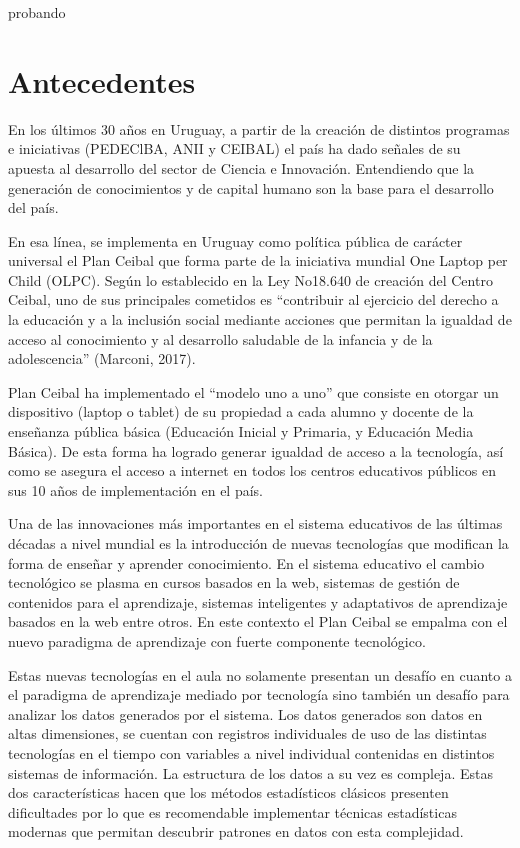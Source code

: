 \documentclass[msc,oneside,a4paper]{udelar}\usepackage[]{graphicx}\usepackage[]{color}
\begin{document}
probando



\chapter{Antecedentes}

En los últimos 30 años en Uruguay, a partir de la creación de distintos programas e iniciativas (PEDEClBA, ANII y CEIBAL) el país ha dado señales de su apuesta al desarrollo del sector de Ciencia e Innovación. Entendiendo que la generación de conocimientos y de capital humano son la base para el desarrollo del país.

En esa línea, se implementa en Uruguay como política pública de carácter universal el Plan Ceibal que forma parte de la iniciativa mundial One Laptop per Child (OLPC). Según lo establecido en la Ley No18.640 de creación del Centro Ceibal, uno de sus principales cometidos es “contribuir al ejercicio del derecho a la educación y a la inclusión social mediante acciones que permitan la igualdad de acceso al conocimiento y al desarrollo saludable de la infancia y de la adolescencia” (Marconi, 2017).

Plan Ceibal ha implementado el “modelo uno a uno” que consiste en otorgar un dispositivo (laptop o tablet) de su propiedad a cada alumno y docente de la enseñanza pública básica (Educación Inicial y Primaria, y Educación Media Básica). De esta forma ha logrado generar igualdad de acceso a la tecnología, así como se asegura el acceso a internet en todos los centros educativos públicos en sus 10 años de implementación en el país.

Una de las innovaciones más importantes en el sistema educativos de las últimas décadas a nivel mundial es la introducción de nuevas tecnologías que modifican la forma de enseñar y aprender conocimiento. En el sistema educativo el cambio tecnológico se plasma en cursos basados en la web, sistemas de gestión de contenidos para el aprendizaje, sistemas inteligentes y adaptativos de aprendizaje basados en la web entre otros. En este contexto el Plan Ceibal se empalma con el nuevo paradigma de aprendizaje con fuerte componente tecnológico.

Estas nuevas tecnologías en el aula no solamente presentan un desafío en cuanto a el paradigma de aprendizaje mediado por tecnología sino también un desafío para analizar los datos generados por el sistema. Los datos generados son datos en altas dimensiones, se cuentan con registros individuales de uso de las distintas tecnologías en el tiempo con variables a nivel individual contenidas en distintos sistemas de información. La estructura de los datos a su vez es compleja. Estas dos características hacen que los métodos estadísticos clásicos presenten dificultades por lo que es recomendable implementar técnicas estadísticas modernas que permitan descubrir patrones en datos con esta complejidad.
\end{document}
